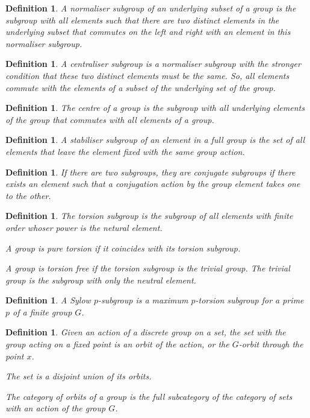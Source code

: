 \documentclass{tufte-book}
\newtheorem{definition}[theorem]{Definition}
\begin{document}
\begin{definition}
  A normaliser subgroup of an underlying subset of a group is the subgroup with all elements such that there are two distinct elements in the underlying subset that commutes on the left and right with an element in this normaliser subgroup.
\end{definition}

\begin{definition}
  A centraliser subgroup is a normaliser subgroup with the stronger condition that these two distinct elements must be the same. So, all elements commute with the elements of a subset of the underlying set of the group.
\end{definition}

\begin{definition}
  The centre of a group is the subgroup with all underlying elements of the group that commutes with all elements of a group.
\end{definition}

\begin{definition}
  A stabiliser subgroup of an element in a full group is the set of all elements that leave the element fixed with the same group action. 
\end{definition}

\begin{definition}
  If there are two subgroups, they are conjugate subgroups if there exists an element such that a conjugation action by the group element takes one to the other.
\end{definition}

\begin{definition}
  The torsion subgroup is the subgroup of all elements with finite order whoser power is the netural element.

  A group is pure torsion if it coincides with its torsion subgroup.

  A group is torsion free if the torsion subgroup is the trivial group. The trivial group is the subgroup with only the neutral element.
\end{definition}

\begin{definition}
  A Sylow $p$-subgroup is a maximum $p$-torsion subgroup for a prime $p$ of a finite group $G$.
\end{definition}

\begin{definition}
  Given an action of a discrete group on a set, the set with the group acting on a fixed point is an orbit of the action, or the $G$-orbit through the point $x$.

  The set is a disjoint union of its orbits.

  The category of orbits of a group is the full subcategory of the category of sets with an action of the group $G$.
\end{definition}
\end{document}
